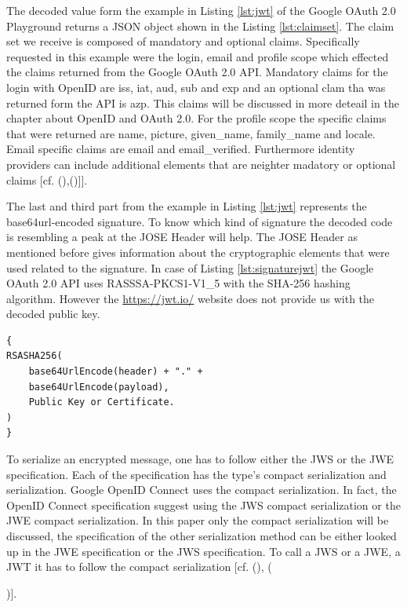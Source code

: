 {The decoded value form the example in Listing \ref{lst:jwt} of the Google OAuth 2.0 Playground \cite{Google:2018:OAuthPlayground} returns a JSON object shown in the Listing \ref{lst:claimset}. The claim set we receive is composed of mandatory and optional claims. Specifically requested in this example were the login, email and profile scope which effected the claims returned from the Google OAuth 2.0 API. Mandatory claims for the login with OpenID are iss, iat, aud, sub and exp and an optional clam tha was returned form the API is azp. This claims will be discussed in more deteail in the chapter about OpenID and OAuth 2.0. For the profile scope the specific claims that were returned are name, picture, given\_name, family\_name and locale. Email specific claims are email and email\_verified. Furthermore identity providers can include additional elements that are neighter madatory or optional claims [cf. ({\cite{Google:2018:OAuthPlayground}),(\cite{Siriwardena:JWTJWSJWE:2016})]}].

The last and third part from the example in  Listing \ref{lst:jwt}  represents the base64url-encoded signature. To know which kind of signature the decoded code is resembling a peak at the JOSE Header will help. The JOSE Header as mentioned before gives information about the cryptographic elements that were used related to the signature. In case of Listing \ref{lst:signaturejwt} the Google OAuth 2.0 API uses RASSSA-PKCS1-V1\_5 with the SHA-256 hashing algorithm. However the \href{https://jwt.io/} {https://jwt.io/} website does not provide us with the decoded public key. 

\begin{lstlisting}
{
RSASHA256(
	base64UrlEncode(header) + "." +
	base64UrlEncode(payload),
	Public Key or Certificate.
)
}
\end{lstlisting}


To serialize an encrypted message, one has to follow either the JWS or the JWE specification. Each of the specification has the type’s compact serialization and serialization. Google OpenID Connect uses the compact serialization. In fact, the OpenID Connect specification suggest using the JWS compact serialization or the JWE compact serialization. In this paper only the compact serialization will be discussed, the specification of the other serialization method can be either looked up in the JWE specification or the JWS specification. To call a JWS or a JWE, a JWT it has to follow the compact serialization [cf. (\cite{JWS:IETF:Jones:2015}), ({\cite{JWE:IETF:Jones:2015})].
	
}}
